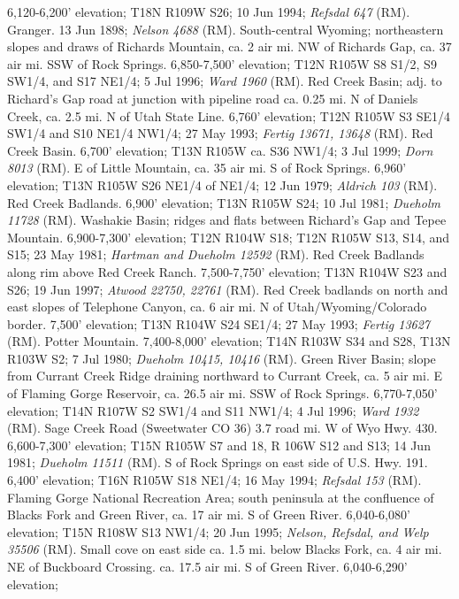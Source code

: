 6,120-6,200' elevation; T18N R109W S26; 10 Jun 1994; \textit{Refsdal 647} (RM).
Granger. 13 Jun 1898; \textit{Nelson 4688} (RM).
South-central Wyoming; northeastern slopes and draws of Richards Mountain, ca. 2
air mi. NW of Richards Gap, ca. 37 air mi. SSW of Rock Springs.
6,850-7,500' elevation; T12N R105W S8 S1/2, S9 SW1/4, and S17 NE1/4; 5 Jul 1996;
\textit{Ward 1960} (RM).
Red Creek Basin; adj. to Richard's Gap road at junction with pipeline road ca.
0.25 mi. N of Daniels Creek, ca. 2.5 mi. N of Utah State Line. 6,760' elevation;
T12N R105W S3 SE1/4 SW1/4 and S10 NE1/4 NW1/4; 27 May 1993;
\textit{Fertig 13671, 13648} (RM).
Red Creek Basin. 6,700' elevation; T13N R105W ca. S36 NW1/4; 3 Jul 1999;
\textit{Dorn 8013} (RM).
E of Little Mountain, ca. 35 air mi. S of Rock Springs. 6,960' elevation;
T13N R105W S26 NE1/4 of NE1/4; 12 Jun 1979; \textit{Aldrich 103} (RM).
Red Creek Badlands. 6,900' elevation; T13N R105W S24; 10 Jul 1981;
\textit{Dueholm 11728} (RM).
Washakie Basin; ridges and flats between Richard's Gap and Tepee Mountain.
6,900-7,300' elevation; T12N R104W S18; T12N R105W S13, S14, and S15;
23 May 1981; \textit{Hartman and Dueholm 12592} (RM).
Red Creek Badlands along rim above Red Creek Ranch.	7,500-7,750' elevation;
T13N R104W S23 and S26; 19 Jun 1997; \textit{Atwood 22750, 22761} (RM).
Red Creek badlands on north and east slopes of Telephone Canyon, ca. 6 air mi.
N of Utah/Wyoming/Colorado border. 7,500' elevation; T13N R104W S24 SE1/4;
27 May 1993; \textit{Fertig 13627} (RM).
Potter Mountain. 7,400-8,000' elevation; T14N R103W S34 and S28,
T13N R103W S2; 7 Jul 1980; \textit{Dueholm 10415, 10416} (RM).
Green River Basin; slope from Currant Creek Ridge draining northward to Currant
Creek, ca. 5 air mi. E of Flaming Gorge Reservoir, ca. 26.5 air mi. SSW of Rock
Springs. 6,770-7,050' elevation; T14N R107W S2 SW1/4 and S11 NW1/4; 4 Jul 1996;
\textit{Ward 1932} (RM).
Sage Creek Road (Sweetwater CO 36) 3.7 road mi. W of Wyo Hwy. 430.
6,600-7,300' elevation; T15N R105W S7 and 18, R 106W S12 and S13; 14 Jun 1981;
\textit{Dueholm 11511} (RM).
S of Rock Springs on east side of U.S. Hwy. 191. 6,400' elevation;
T16N R105W S18 NE1/4; 16 May 1994; \textit{Refsdal 153} (RM).
Flaming Gorge National Recreation Area; south peninsula at the confluence of
Blacks Fork and Green River, ca. 17 air mi. S of Green River.
6,040-6,080' elevation; T15N R108W S13 NW1/4; 20 Jun 1995;
\textit{Nelson, Refsdal, and Welp 35506} (RM).
Small cove on east side ca. 1.5 mi. below Blacks Fork, ca. 4 air mi. NE of
Buckboard Crossing. ca. 17.5 air mi. S of Green River. 6,040-6,290' elevation;
